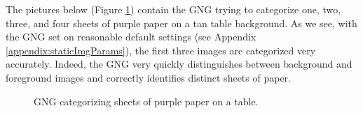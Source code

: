 \documentclass{article}
\renewcommand{\|}{\origbar} %
\begin{document}
The pictures below (Figure \ref{fig:1-4papers}) contain the GNG trying to categorize one, two, three, and four sheets of purple paper on a tan table background. As we see, with the GNG set on reasonable default settings (see Appendix \ref{appendix:staticImgParams}), the first three images are categorized very accurately. Indeed, the GNG very quickly distinguishes between background and foreground images and correctly identifies distinct sheets of paper. 

\begin{figure}[h!]
  \centering


  \caption{GNG categorizing sheets of purple paper on a table.}
  \label{fig:1-4papers}
\end{figure}
\end{document}
